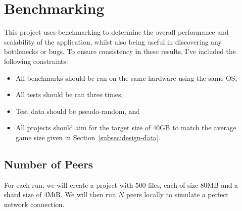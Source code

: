 
\newpage
\section{Benchmarking}\label{sec:benchmark}

This project uses benchmarking to determine the overall performance and scalability of the application, whilst also being useful in discovering any bottlenecks or bugs.
\x
To ensure consistency in these results, I've included the following constraints:

\begin{itemize}
  \item All benchmarks should be ran on the same hardware using the same OS,
  \item All tests should be ran three times,
  \item Test data should be pseudo-random, and
  \item All projects should aim for the target size of 40GB to match the average game size given in Section~\ref{subsec:design-data}.
\end{itemize}

\subsection*{Number of Peers}

For each run, we will create a project with 500 files, each of size 80MB and a shard size of 4MiB. We will then run $N$ peers locally to simulate a perfect network connection.


